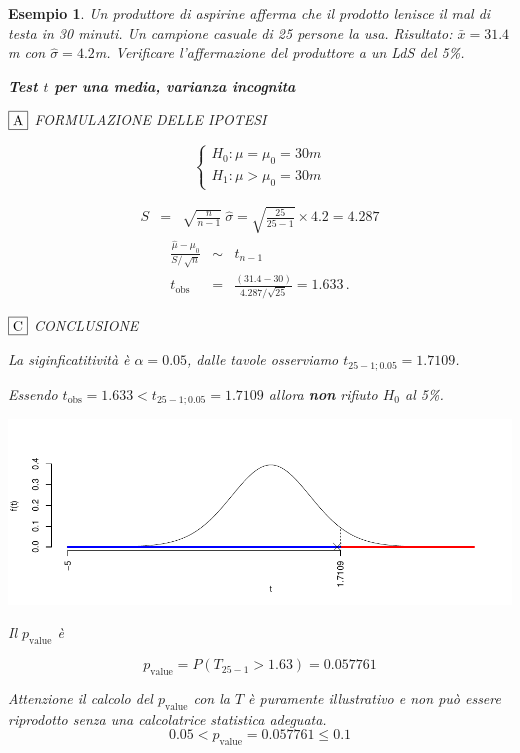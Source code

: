 \documentclass[
  11pt,
]{book}
\theoremstyle{mytheoremstyle}
\theoremstyle{mydefstyle}
\newtheorem{example}{{Esempio}}[section]
\begin{document}
\begin{example}
Un produttore di aspirine afferma che il prodotto lenisce il mal di
testa in 30 minuti. Un campione casuale di 25 persone la usa. Risultato:
\(\bar{x}=31.4\)m con \(\hat{\sigma}= 4.2\)m. Verificare l'affermazione del
produttore a un LdS del 5\%.

\textbf{Test \(t\) per una media, varianza incognita}

\(\fbox{A}\) FORMULAZIONE DELLE IPOTESI

\[\begin{cases}
   H_0: \mu = \mu_0=30m \\
   H_1: \mu > \mu_0=30m 
   \end{cases}\]

\begin{eqnarray*}
   S    &=& \sqrt{\frac{n} {n-1}}\ \widehat{\sigma} 
   =  \sqrt{\frac{ 25 } { 25 -1}} \times  4.2  =  4.287 
   \end{eqnarray*}
\begin{eqnarray*}
   \frac{\hat\mu - \mu_{0}} {S/\,\sqrt{n}}&\sim&t_{n-1}\\
   t_{\text{obs}}
   &=& \frac{ ( 31.4 -  30 )} { 4.287 /\sqrt{ 25 }}
   =   1.633 \, .
   \end{eqnarray*}

\(\fbox{C}\) CONCLUSIONE

La siginficatitività è \(\alpha=0.05\), dalle tavole osserviamo \(t_{25-1;0.05}=1.7109\).

Essendo \(t_\text{obs}=1.633<t_{25-1;0.05}=1.7109\) allora \textbf{non} rifiuto \(H_0\) al 5\%.

\begin{center}\includegraphics{Appunti_di_Statistica_2025_files/figure-latex/15-test-mu-pi-5,-1} \end{center}

Il \(p_{\text{value}}\) è

\[ p_{\text{value}} = P(T_{25-1}>1.63)=0.057761 \]

Attenzione il calcolo del \(p_\text{value}\) con la \(T\) è puramente illustrativo e non può essere riprodotto senza una calcolatrice statistica adeguata.\[
 0.05 < p_\text{value}= 0.057761 \leq 0.1 
\]
\end{example}
\end{document}
